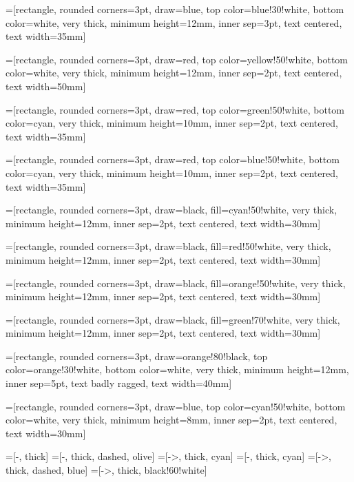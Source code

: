 
%
%

=[rectangle, rounded corners=3pt, draw=blue, top color=blue!30!white, bottom
color=white, very thick, minimum height=12mm, inner sep=3pt, text centered, text width=35mm]

=[rectangle, rounded corners=3pt, draw=red, top color=yellow!50!white, bottom
color=white, very thick, minimum height=12mm, inner sep=2pt, text centered, text width=50mm]

=[rectangle, rounded corners=3pt, draw=red, top color=green!50!white, bottom
color=cyan, very thick, minimum height=10mm, inner sep=2pt, text centered, text width=35mm]

=[rectangle, rounded corners=3pt, draw=red, top color=blue!50!white, bottom
color=cyan, very thick, minimum height=10mm, inner sep=2pt, text centered, text width=35mm]

=[rectangle, rounded corners=3pt, draw=black, fill=cyan!50!white, 
 very thick, minimum height=12mm, inner sep=2pt,  text centered, text width=30mm]

=[rectangle, rounded corners=3pt, draw=black, fill=red!50!white, 
 very thick, minimum height=12mm, inner sep=2pt,  text centered, text width=30mm]

=[rectangle, rounded corners=3pt, draw=black, fill=orange!50!white, 
 very thick, minimum height=12mm, inner sep=2pt,  text centered, text width=30mm]

=[rectangle, rounded corners=3pt, draw=black, fill=green!70!white, 
 very thick, minimum height=12mm, inner sep=2pt,  text centered, text width=30mm]

=[rectangle, rounded corners=3pt, draw=orange!80!black, top color=orange!30!white,
bottom color=white, very thick, minimum height=12mm, inner sep=5pt, text badly ragged, text width=40mm]

=[rectangle, rounded corners=3pt, draw=blue, top color=cyan!50!white, bottom
color=white, very thick, minimum height=8mm, inner sep=2pt, text centered, text width=30mm]

=[-, thick]
=[-, thick, dashed, olive]
=[->, thick, cyan]
=[-, thick, cyan]
=[->, thick, dashed, blue]
=[->, thick,  black!60!white]


